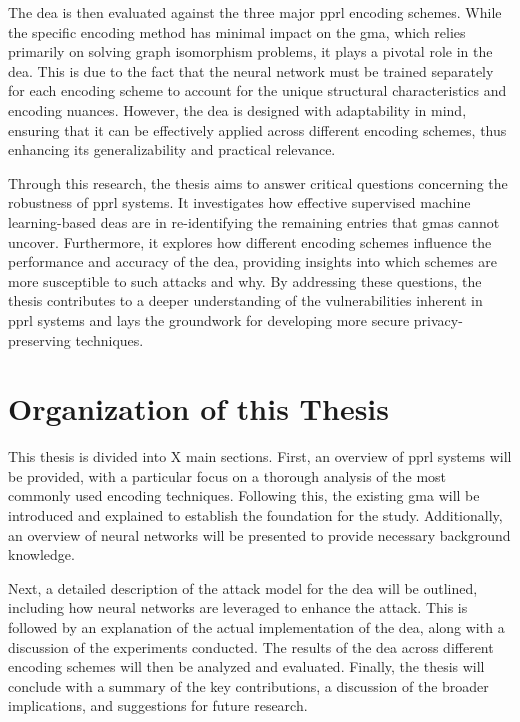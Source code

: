 The \ac{dea} is then evaluated against the three major \ac{pprl} encoding schemes. 
While the specific encoding method has minimal impact on the \ac{gma}, which relies primarily on solving graph isomorphism problems, it plays a pivotal role in the \ac{dea}. 
This is due to the fact that the neural network must be trained separately for each encoding scheme to account for the unique structural characteristics and encoding nuances. 
However, the \ac{dea} is designed with adaptability in mind, ensuring that it can be effectively applied across different encoding schemes, thus enhancing its generalizability and practical relevance.

Through this research, the thesis aims to answer critical questions concerning the robustness of \ac{pprl} systems. 
It investigates how effective supervised machine learning-based \ac{dea}s are in re-identifying the remaining entries that \ac{gma}s cannot uncover.
Furthermore, it explores how different encoding schemes influence the performance and accuracy of the \ac{dea}, providing insights into which schemes are more susceptible to such attacks and why. 
By addressing these questions, the thesis contributes to a deeper understanding of the vulnerabilities inherent in \ac{pprl} systems and lays the groundwork for developing more secure privacy-preserving techniques.




\section{Organization of this Thesis}  \label{sec:orga}

This thesis is divided into X main sections.
First, an overview of \ac{pprl} systems will be provided, with a particular focus on a thorough analysis of the most commonly used encoding techniques.
Following this, the existing \ac{gma} will be introduced and explained to establish the foundation for the study.
Additionally, an overview of neural networks will be presented to provide necessary background knowledge.

Next, a detailed description of the attack model for the \ac{dea} will be outlined, including how neural networks are leveraged to enhance the attack.
This is followed by an explanation of the actual implementation of the \ac{dea}, along with a discussion of the experiments conducted.
The results of the \ac{dea} across different encoding schemes will then be analyzed and evaluated.
Finally, the thesis will conclude with a summary of the key contributions, a discussion of the broader implications, and suggestions for future research.